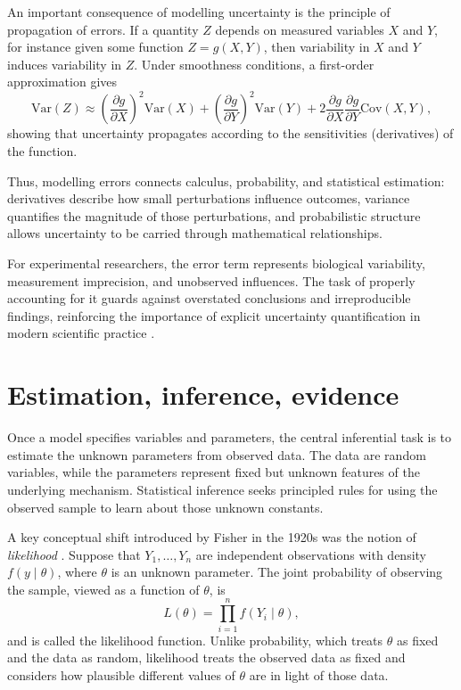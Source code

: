 An important consequence of modelling uncertainty is the principle of propagation of errors. If a quantity \(Z\) depends on measured variables \(X\) and \(Y\), for instance given some function \(Z = g(X,Y)\), then variability in \(X\) and \(Y\) induces variability in \(Z\). Under smoothness conditions, a first-order approximation gives
\[
    \mathrm{Var}(Z) \approx 
    \left(\frac{\partial g}{\partial X}\right)^2 \mathrm{Var}(X)
    +
    \left(\frac{\partial g}{\partial Y}\right)^2 \mathrm{Var}(Y)
    +
    2\frac{\partial g}{\partial X}\frac{\partial g}{\partial Y}\mathrm{Cov}(X,Y),
\]
showing that uncertainty propagates according to the sensitivities (derivatives) of the function.

\medskip

Thus, modelling errors connects calculus, probability, and statistical estimation: derivatives describe how small perturbations influence outcomes, variance quantifies the magnitude of those perturbations, and probabilistic structure allows uncertainty to be carried through mathematical relationships.

\medskip

For experimental researchers, the error term represents biological variability, measurement imprecision, and unobserved influences. The task of properly accounting for it guards against overstated conclusions and irreproducible findings, reinforcing the importance of explicit uncertainty quantification in modern scientific practice \cite{ioannidis_2005_false}. 

\section{Estimation, inference, evidence}

Once a model specifies variables and parameters, the central inferential task is to estimate the unknown parameters from observed data. The data are random variables, while the parameters represent fixed but unknown features of the underlying mechanism. Statistical inference seeks principled rules for using the observed sample to learn about those unknown constants.

\medskip

A key conceptual shift introduced by Fisher in the 1920s was the notion of \emph{likelihood} \cite{fisher_1925_statistical}. Suppose that \(Y_1,\dots,Y_n\) are independent observations with density \(f(y \mid \theta)\), where \(\theta\) is an unknown parameter. The joint probability of observing the sample, viewed as a function of \(\theta\), is
\[
L(\theta) = \prod_{i=1}^n f(Y_i \mid \theta),
\]
and is called the likelihood function. Unlike probability, which treats \(\theta\) as fixed and the data as random, likelihood treats the observed data as fixed and considers how plausible different values of \(\theta\) are in light of those data.

